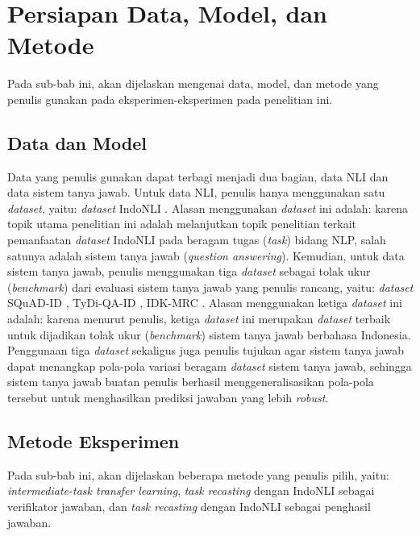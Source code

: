 \section{Persiapan Data, Model, dan Metode}
Pada sub-bab ini, akan dijelaskan mengenai data, model, dan metode yang penulis gunakan pada eksperimen-eksperimen pada penelitian ini. 

\subsection{Data dan Model}
Data yang penulis gunakan dapat terbagi menjadi dua bagian, data NLI dan data sistem tanya jawab. Untuk data NLI, penulis hanya menggunakan satu \emph{dataset}, yaitu: \emph{dataset} IndoNLI \citep{mahendra-etal-2021-indonli}. Alasan menggunakan \emph{dataset} ini adalah: karena topik utama penelitian ini adalah melanjutkan topik penelitian \citet{mahendra-etal-2021-indonli} terkait pemanfaatan \emph{dataset} IndoNLI pada beragam tugas (\emph{task}) bidang NLP, salah satunya adalah sistem tanya jawab (\emph{question answering}). Kemudian, untuk data sistem tanya jawab, penulis menggunakan tiga \emph{dataset} sebagai tolak ukur (\emph{benchmark}) dari evaluasi sistem tanya jawab yang penulis rancang, yaitu: \emph{dataset} SQuAD-ID \citep{muis2020sequencetosequence}, TyDi-QA-ID \citep{cahyawijaya-etal-2021-indonlg}, IDK-MRC \citep{putri-oh-2022-idk}. Alasan menggunakan ketiga \emph{dataset} ini adalah: karena menurut penulis, ketiga \emph{dataset} ini merupakan \emph{dataset} terbaik untuk dijadikan tolak ukur (\emph{benchmark}) sistem tanya jawab berbahasa Indonesia. Penggunaan tiga \emph{dataset} sekaligus juga penulis tujukan agar sistem tanya jawab dapat menangkap pola-pola variasi beragam \emph{dataset} sistem tanya jawab, sehingga sistem tanya jawab buatan penulis berhasil menggeneralisasikan pola-pola tersebut untuk menghasilkan prediksi jawaban yang lebih \emph{robust}.

\subsection{Metode Eksperimen}
Pada sub-bab ini, akan dijelaskan beberapa metode yang penulis pilih, yaitu: \emph{intermediate-task transfer learning}, \emph{task recasting} dengan IndoNLI sebagai verifikator jawaban, dan \emph{task recasting} dengan IndoNLI sebagai penghasil jawaban. 

